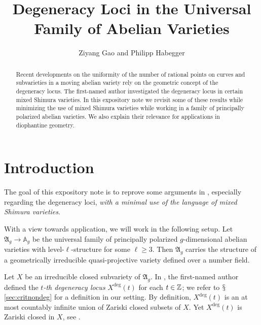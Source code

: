 \documentclass[12pt,oneside]{amsart}
\newcommand{\ziyang}[1]{{\color{red} Ziyang: #1}}
\begin{document}
\title{Degeneracy Loci in the Universal Family of Abelian Varieties}
\author{Ziyang Gao and Philipp Habegger}
\address{IAZD (Institute of Algebra, Number Theory and Discrete Mathematics), Leibniz University Hannover, Welfengarten 1, 30167 Hannover, Germany}
\address{Department of Mathematics and Computer Science, University of Basel, Spiegelgasse 1, 4051 Basel, Switzerland}
\begin{abstract}
  Recent developments  on the
  uniformity of the number of
  rational points on curves and subvarieties in a moving abelian
  variety rely on the geometric concept of the degeneracy locus.
  The first-named author
  investigated the degeneracy locus in certain mixed
  Shimura varieties. In this expository note we revisit some of these results
    while minimizing the use of mixed Shimura varieties while working
    in a family of principally polarized abelian varieties. We also
  explain their relevance for applications in diophantine geometry.
\end{abstract}
\maketitle
\tableofcontents

\section{Introduction}


The goal of this expository note is to reprove some arguments in \cite{Gao:SNS17, GaoBettiRank}, especially regarding the degeneracy loci, \textit{with a minimal use of the language of mixed Shimura varieties}.%

\smallskip

With a view towards application, we will work in the following setup.
Let $\mathfrak{A}_g \rightarrow \mathbb{A}_g$ be the
universal family of principally polarized $g$-dimensional abelian
varieties with level-$\ell$-structure for some $\ell\ge 3$. Then
$\mathfrak{A}_g$ carries the structure of a geometrically irreducible
quasi-projective variety defined over a number field.

Let $X$ be an irreducible closed subvariety of $\mathfrak{A}_g$. In
\cite{GaoBettiRank}, the first-named author defined the \textit{$t$-th
degeneracy locus} $X^{\mathrm{deg}}(t)$ for each $t \in {\mathbb{Z}}$; we refer
to $\mathsection$\ref{sec:critnondeg} for a definition in our setting.
By definition, $X^{\mathrm{deg}}(t)$ is an at most countably infinite
union of Zariski closed subsets of $X$.
Yet $X^{\mathrm{deg}}(t)$ is Zariski closed in $X$, see
\cite[Theorem~1.8]{GaoBettiRank}.
\end{document}

